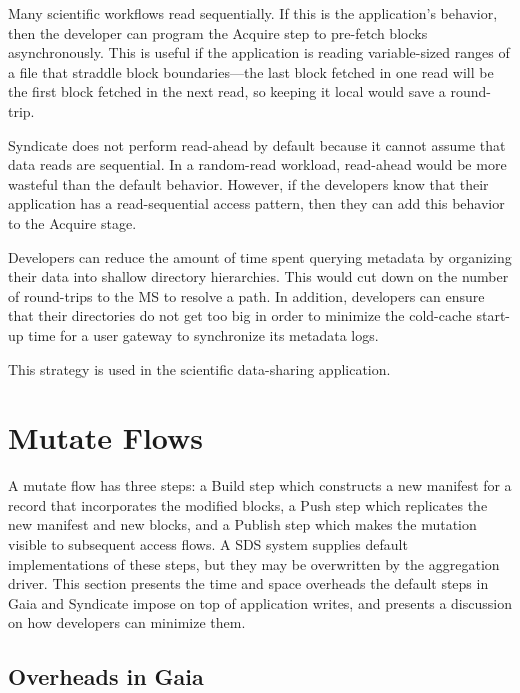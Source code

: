 \hfill \break
{}
\hfill \break

Many scientific workflows read sequentially.  If this is the application's
behavior, then the developer can program the Acquire step to pre-fetch blocks
asynchronously.  This is useful if the application is reading
variable-sized ranges of a file that straddle block boundaries---the last block
fetched in one read will be the first block fetched in the next read, so keeping
it local would save a round-trip.

Syndicate does not perform read-ahead by
default because it cannot assume that data reads are sequential.  In a
random-read workload, read-ahead would be more wasteful than the default
behavior.  However, if  the developers know that their application has a
read-sequential access pattern, then they can add this behavior to the Acquire
stage.

\hfill \break
\hfill \break
{}
\hfill \break

Developers can reduce the amount of time spent querying metadata by organizing
their data into shallow directory hierarchies.  This would cut down on the
number of round-trips to the MS to resolve a path.  In addition, developers can
ensure that their directories do not get too big in order to minimize the
cold-cache start-up time for a user gateway to synchronize its metadata logs.

This strategy is used in the scientific data-sharing application.

\section{Mutate Flows}

A mutate flow has three steps:  a Build step which constructs a new manifest
for a record that incorporates the modified blocks, a Push step which replicates
the new manifest and new blocks, and a Publish step which makes the mutation
visible to subsequent access flows.  A SDS system supplies default
implementations of these steps, but they may be overwritten by the aggregation
driver.  This section presents the time and space overheads the default steps in
Gaia and Syndicate impose on top of application writes, and presents a
discussion on how developers can minimize them.

\subsection{Overheads in Gaia}

